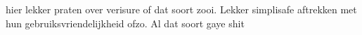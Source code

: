 hier lekker praten over verisure of dat soort zooi.
Lekker simplisafe aftrekken met hun gebruiksvriendelijkheid ofzo.
Al dat soort gaye shit